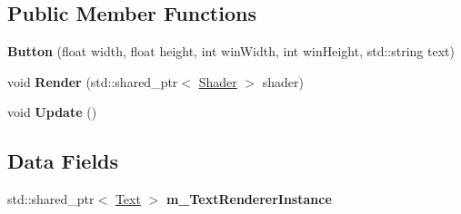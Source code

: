 \subsection*{Public Member Functions}
\begin{DoxyCompactItemize}
\item 
{\bfseries Button} (float width, float height, int win\+Width, int win\+Height, std\+::string text)\hypertarget{class_button_ac9e452a0f12897a81fd5e052176aeaf6}{}\label{class_button_ac9e452a0f12897a81fd5e052176aeaf6}

\item 
void {\bfseries Render} (std\+::shared\+\_\+ptr$<$ \hyperlink{class_shader}{Shader} $>$ shader)\hypertarget{class_button_a746cc4d16abaf65168806b3b1505c011}{}\label{class_button_a746cc4d16abaf65168806b3b1505c011}

\item 
void {\bfseries Update} ()\hypertarget{class_button_a23e8bc9ad05142244ea4e79a406a6c9c}{}\label{class_button_a23e8bc9ad05142244ea4e79a406a6c9c}

\end{DoxyCompactItemize}
\subsection*{Data Fields}
\begin{DoxyCompactItemize}
\item 
std\+::shared\+\_\+ptr$<$ \hyperlink{class_text}{Text} $>$ {\bfseries m\+\_\+\+Text\+Renderer\+Instance}\hypertarget{class_button_afc58e980e856ef0a9f5835846261e751}{}\label{class_button_afc58e980e856ef0a9f5835846261e751}

\end{DoxyCompactItemize}
